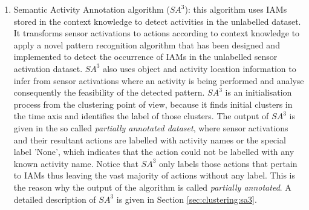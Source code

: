 \begin{enumerate}
 \item Semantic Activity Annotation algorithm ($SA^3$): this algorithm uses IAMs stored in the context knowledge to detect activities in the unlabelled dataset. It transforms sensor activations to actions according to context knowledge to apply a novel pattern recognition algorithm that has been designed and implemented to detect the occurrence of IAMs in the unlabelled sensor activation dataset. $SA^3$ also uses object and activity location information to infer from sensor activations where an activity is being performed and analyse consequently the feasibility of the detected pattern. $SA^3$ is an initialisation process from the clustering point of view, because it finds initial clusters in the time axis and identifies the label of those clusters. The output of $SA^3$ is given in the so called \textit{partially annotated dataset}, where sensor activations and their resultant actions are labelled with activity names or the special label 'None', which indicates that the action could not be labelled with any known activity name. Notice that $SA^3$ only labels those actions that pertain to IAMs thus leaving the vast majority of actions without any label. This is the reason why the output of the algorithm is called \textit{partially annotated}. A detailed description of $SA^3$ is given in Section \ref{sec:clustering:sa3}.

\end{enumerate}

